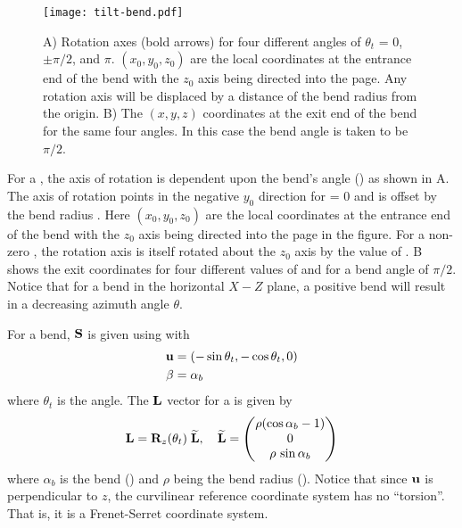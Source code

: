 
\begin{figure}
\centering \texttt{[image: tilt-bend.pdf]} 
\caption[Orientation of a Bend.] 
  {
A) Rotation axes (bold arrows) for four different  angles of $\theta_t$ = 0, $\pm
\pi/2$, and $\pi$. $(x_0, y_0, z_0)$ are the local coordinates at the entrance end of the bend with
the $z_0$ axis being directed into the page. Any rotation axis will be displaced by a distance of
the bend radius  from the origin. B) The $(x, y, z)$ coordinates at the exit end of the bend
for the same four  angles. In this case the bend angle is taken to be $\pi/2$.
  }
  \label{f:tilt.bend}
\end{figure}


For a , the axis of rotation is dependent upon the bend's  angle
() as shown in A. The axis of rotation points in the negative $y_0$
direction for  = 0 and is offset by the bend radius . Here $(x_0, y_0, z_0)$
are the local coordinates at the entrance end of the bend with the $z_0$ axis being directed into
the page in the figure.  For a non-zero , the rotation axis is itself rotated about the
$z_0$ axis by the value of . B shows the exit coordinates for four
different values of  and for a bend angle  of $\pi/2$.  Notice that for a
bend in the horizontal $X-Z$ plane, a positive bend  will result in a decreasing azimuth
angle $\theta$.

For a bend, ${\bf S}$ is given using  with 
\begin{align}
  {\bf u} &= (-\sin\theta_t, -\cos\theta_t, 0) \nonumber \\
  \beta &= \alpha_b
  \label{ustt}
\end{align}
where $\theta_t$ is the  angle. The ${\bf L}$ vector for a  is given by 
\begin{equation}
  {\bf L} = {\bf R}_{z}(\theta_t) \; {\widetilde{\bf L}}, \quad
  {\widetilde{\bf L}} = 
  \begin{pmatrix}
    \rho (\cos\alpha_b - 1) \\ 0 \\ \rho \, \sin\alpha_b
  \end{pmatrix}
  \label{lrztt}
\end{equation}
where $\alpha_b$ is the bend  () and $\rho$ being the bend radius
(). Notice that since ${\bf u}$ is perpendicular to $z$, the curvilinear reference coordinate
system has no ``torsion''. That is, it is a Frenet-Serret coordinate system.

